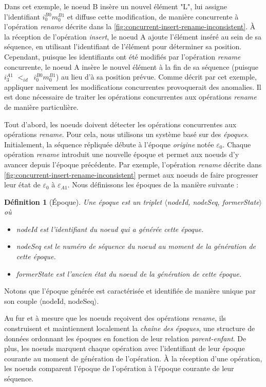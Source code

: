 \documentclass[12pt]{thesul}
\newtheorem{definition}{Définition}
\newcommand{\trm}[1]{\mathit{#1}}
\newcommand{\id}[3]{$\trm{#1}^{\trm{#2}}_{\trm{#3}}$}
\newcommand{\epoch}[1]{$\varepsilon_{#1}$}
\newcommand{\lid}{$<_{id}$~}
\begin{document}
Dans cet exemple, le noeud B insère un nouvel élément "L", lui assigne l'identifiant \id{i}{B0}{0}\id{m}{B1}{0} et diffuse cette modification, de manière concurrente à l'opération \emph{rename} décrite dans la \autoref{fig:concurrent-insert-rename-inconsistent}.
À la réception de l'opération \emph{insert}, le noeud A ajoute l'élément inséré au sein de sa séquence, en utilisant l'identifiant de l'élément pour déterminer sa position.
Cependant, puisque les identifiants ont été modifiés par l'opération \emph{rename} concurrente, le noeud A insère le nouvel élément à la fin de sa séquence (puisque \id{i}{A1}{3} \lid \id{i}{B0}{0}\id{m}{B1}{0}) au lieu d'à sa position prévue.
Comme décrit par cet exemple, appliquer naivement les modifications concurrentes provoquerait des anomalies.
Il est donc nécessaire de traiter les opérations concurrentes aux opérations \emph{rename} de manière particulière.

Tout d'abord, les noeuds doivent détecter les opérations concurrentes aux opérations \emph{rename}.
Pour cela, nous utilisons un système basé sur des \emph{époques}.
Initialement, la séquence répliquée débute à l'époque \emph{origine} notée \epoch{0}.
Chaque opération \emph{rename} introduit une nouvelle époque et permet aux noeuds d'y avancer depuis l'époque précédente.
Par exemple, l'opération \emph{rename} décrite dans \autoref{fig:concurrent-insert-rename-inconsistent} permet aux noeuds de faire progresser leur état de \epoch{0} à \epoch{A1}.
Nous définissons les époques de la manière suivante :

\begin{definition}[Époque]
  Une époque est un triplet $\langle$nodeId, nodeSeq, formerState$\rangle$ où
  \begin{itemize}
    \item nodeId est l'identifiant du noeud qui a générée cette époque.
    \item nodeSeq est le numéro de séquence du noeud au moment de la génération de cette époque.
    \item formerState est l'ancien état du noeud de la génération de cette époque.
  \end{itemize}
\end{definition}

Notons que l'époque générée est caractérisée et identifiée de manière unique par son couple $\langle$nodeId, nodeSeq$\rangle$.

Au fur et à mesure que les noeuds reçoivent des opérations \emph{rename}, ils construisent et maintiennent localement la \emph{chaîne des époques}, une structure de données ordonnant les époques en fonction de leur relation \emph{parent-enfant}.
De plus, les noeuds marquent chaque opération avec l'identifiant de leur époque courante au moment de génération de l'opération.
À la réception d'une opération, les noeuds comparent l'époque de l'opération à l'époque courante de leur séquence.
\end{document}
